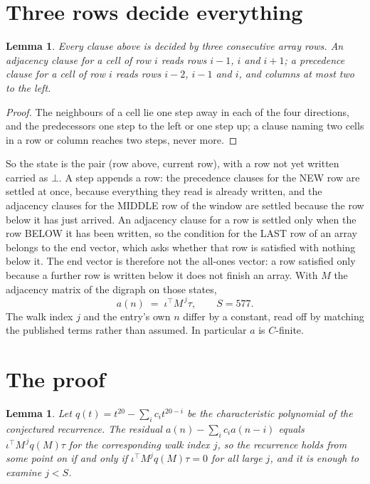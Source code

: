 \documentclass[11pt,a4paper]{article}
\theoremstyle{plain}
\newtheorem{lemma}[theorem]{Lemma}
\theoremstyle{definition}
\begin{document}
\section{Three rows decide everything}

\begin{lemma}\label{lem:win}
Every clause above is decided by three consecutive array rows. An adjacency clause for a cell
of row $i$ reads rows $i-1$, $i$ and $i+1$; a precedence clause for a cell of row $i$ reads
rows $i-2$, $i-1$ and $i$, and columns at most two to the left.
\end{lemma}

\begin{proof}
The neighbours of a cell lie one step away in each of the four directions, and the predecessors
one step to the left or one step up; a clause naming two cells in a row or column reaches two
steps, never more.
\end{proof}

So the state is the pair (row above, current row), with a row not yet written carried as
$\bot$. A step appends a row: the precedence clauses for the NEW row are settled at once,
because everything they read is already written, and the adjacency clauses for the MIDDLE row
of the window are settled because the row below it has just arrived. An adjacency clause for a row is settled only when the row BELOW it has been
written, so the condition for the LAST row of an array belongs to the end vector, which asks
whether that row is satisfied with nothing below it. The end vector is therefore not the
all-ones vector: a row satisfied only because a further row is written below it does not
finish an array. With $M$ the
adjacency matrix of the digraph on those states,
\[
a(n)\;=\;\iota^{\!\top}M^{\,j}\tau ,\qquad S=577.
\]
The walk index $j$ and the entry's own $n$ differ by a constant, read off by matching the
published terms rather than assumed. In particular $a$ is $C$-finite.

\section{The proof}

\begin{lemma}\label{lem:crit}
Let $q(t)=t^{20}-\sum_i c_it^{20-i}$ be the characteristic polynomial of the
conjectured recurrence. The residual $a(n)-\sum_ic_ia(n-i)$ equals
$\iota^{\!\top}M^{\,j}q(M)\tau$ for the corresponding walk index $j$, so the recurrence
holds from some point on if and only if $\iota^{\!\top}M^{j}q(M)\tau=0$ for all large $j$,
and it is enough to examine $j<S$.
\end{lemma}
\end{document}
